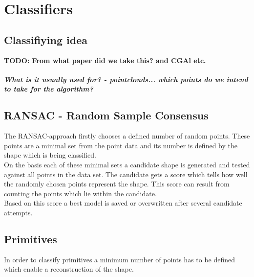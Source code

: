 \documentclass[../ClassicThesis.tex]{subfiles}
\begin{document}
\chapter{Classifiers}\label{ch:classifiers}

\section{Classifiying idea}
\textbf{TODO: From what paper did we take this? and CGAl etc.}
\paragraph{What is it usually used for? - pointclouds... which points do we intend to take for the algorithm?}
\section{RANSAC - Random Sample Consensus}
The RANSAC-approach firstly chooses a defined number of random points. These points are a minimal set from the point data and its number is defined by the shape which is being classified.\\
On the basis each of these minimal sets a candidate shape is generated and tested against all points in the data set. The candidate gets a score which tells how well the randomly chosen points represent the shape. This score can result from counting the points which lie within the candidate.\\
Based on this score a best model is saved or overwritten after several candidate attempts.
\section{Primitives}
In order to classify primitives a minimum number of points has to be defined which enable a reconstruction of the shape.
\end{document}
